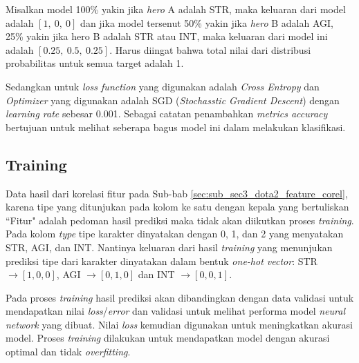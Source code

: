 Misalkan model 100\% yakin jika \textit{hero} A adalah STR, maka keluaran dari model adalah $\left[1,\ 0,\ 0 \right]$ dan jika model tersenut 50\% yakin jika \textit{hero} B adalah AGI, 25\% yakin jika hero B adalah STR atau INT, maka keluaran dari model ini adalah $\left[0.25,\ 0.5,\ 0.25 \right]$. Harus diingat bahwa total nilai dari distribusi probabilitas untuk semua target adalah 1.
\vspace{1ex}

Sedangkan untuk \textit{loss function} yang digunakan adalah \textit{Cross Entropy} dan \textit{Optimizer} yang digunakan adalah SGD (\textit{Stochasstic Gradient Descent}) dengan \textit{learning rate} sebesar 0.001. Sebagai catatan penambahkan \textit{metrics accuracy} bertujuan untuk melihat seberapa bagus model ini dalam melakukan klasifikasi.
\vspace{1ex}

\subsection{Training}
\label{sec:sub_sec3_dota2_train}
\vspace{1ex}

Data hasil dari korelasi fitur pada Sub-bab \ref{sec:sub_sec3_dota2_feature_corel}, karena tipe yang ditunjukan pada kolom ke satu dengan kepala yang bertuliskan ``Fitur" adalah pedoman hasil prediksi maka tidak akan diikutkan proses \textit{training}. Pada kolom \textit{type} tipe karakter dinyatakan dengan 0, 1, dan 2 yang menyatakan STR, AGI, dan INT. Nantinya keluaran dari hasil \textit{training} yang menunjukan prediksi tipe dari karakter dinyatakan dalam bentuk \textit{one-hot vector}: STR $\rightarrow [1, 0, 0]$, AGI $\rightarrow [0, 1, 0]$ dan INT $\rightarrow [0, 0, 1]$. 
\vspace{1ex}

Pada proses \textit{training} hasil prediksi akan dibandingkan dengan data validasi untuk mendapatkan nilai \textit{loss}/\textit{error} dan validasi untuk melihat performa model \textit{neural network} yang dibuat. Nilai \textit{loss} kemudian digunakan untuk meningkatkan akurasi model. Proses \textit{training} dilakukan untuk mendapatkan model dengan akurasi optimal dan tidak \textit{overfitting}.
\vspace{1ex}


